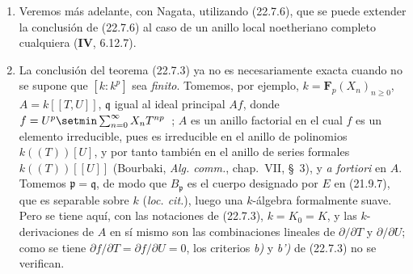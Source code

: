 \begin{remarks}[22.7.7]
\label{0.22.7.7-fr}
\begin{enumerate}
  \item[(i)] Veremos más adelante, con Nagata, utilizando (22.7.6), que
  se puede extender la conclusión de (22.7.6) al caso de un anillo local
  noetheriano completo cualquiera (\textbf{IV}, 6.12.7).

  \item[(ii)] La conclusión del teorema (22.7.3) ya no es necesariamente
  exacta cuando no se supone que $[k:k^p]$ sea \emph{finito}. Tomemos, por
  ejemplo, $k=\mathbf F_p(X_n)_{n\geqslant0}$,
  $A=k[[T,U]]$, $\mathfrak q$ igual al ideal principal $Af$, donde
  $f=U^p\setmin\sum_{n=0}^{\infty}X_nT^{np}$~;
  $A$ es un anillo factorial en el cual $f$ es un elemento irreducible, pues es
  irreducible en el anillo de polinomios $k((T))[U]$, y por tanto también en
  el anillo de series formales $k((T))[[U]]$ (Bourbaki,
  \emph{Alg. comm.}, chap.~VII, §~3), y \emph{a fortiori} en $A$.
  Tomemos $\mathfrak p=\mathfrak q$, de modo que $B_{\mathfrak p}$ es el
  cuerpo designado por $E$ en (21.9.7), que es separable sobre $k$
  (\emph{loc. cit.}), luego una $k$-álgebra formalmente suave. Pero se tiene aquí,
  con las notaciones de (22.7.3), $k=K_0=K$, y las $k$-derivaciones de $A$
  en sí mismo son las combinaciones lineales de $\partial/\partial T$ y
  $\partial/\partial U$; como se tiene
  $\partial f/\partial T=\partial f/\partial U=0$, los criterios \emph{b)} y \emph{b')} de
  (22.7.3) no se verifican.
\end{enumerate}
\end{remarks}
